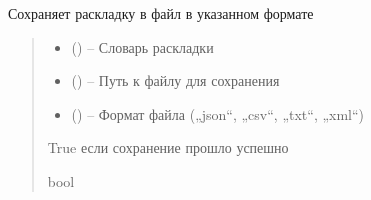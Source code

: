 \documentclass[a4paper,11pt,russian,openany,oneside]{sphinxmanual}
\begin{document}
\begin{savenotes}\begin{fulllineitems}
\label{\detokenize{scan_module:scan_module.read_layout.save_layout_to_file}}
\pysigstartsignatures
\pysiglinewithargsret
{}
{\sphinxparamcomma {}\sphinxparamcomma {}}
{}
\pysigstopsignatures
\sphinxAtStartPar
Сохраняет раскладку в файл в указанном формате
\begin{quote}\begin{description}
\begin{itemize}
\item {} 
\sphinxAtStartPar
{} () – Словарь раскладки

\item {} 
\sphinxAtStartPar
{} () – Путь к файлу для сохранения

\item {} 
\sphinxAtStartPar
{} () – Формат файла („json“, „csv“, „txt“, „xml“)

\end{itemize}

\sphinxAtStartPar
True если сохранение прошло успешно

\sphinxAtStartPar
bool

\end{description}\end{quote}

\end{fulllineitems}\end{savenotes}

\end{document}

